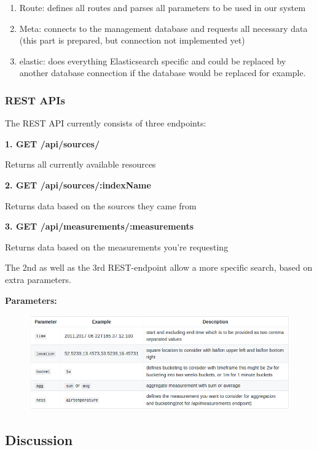 \begin{enumerate}
\def\labelenumi{\arabic{enumi}.}
\tightlist
\item
  Route: defines all routes and parses all parameters to be used in our
  system
\item
  Meta: connects to the management database and requests all necessary
  data (this part is prepared, but connection not implemented yet)
\item
  elastic: does everything Elasticsearch specific and could be replaced
  by another database connection if the database would be replaced for
  example.
\end{enumerate}

\subsubsection{REST APIs}\label{rest-apis}

The REST API currently consists of three endpoints:

\textbf{1. GET /api/sources/}

Returns all currently available resources

\textbf{2. GET /api/sources/:indexName}

Returns data based on the sources they came from

\textbf{3. GET /api/measurements/:measurements}

Returns data based on the measurements you're requesting

The 2nd as well as the 3rd REST-endpoint allow a more specific search,
based on extra parameters.

\textbf{Parameters:}

\begin{figure}[htbp]
\centering
\includegraphics[width=1.00\textwidth]{images/07-table.png}
\end{figure}

\subsection{Discussion}\label{discussion}

